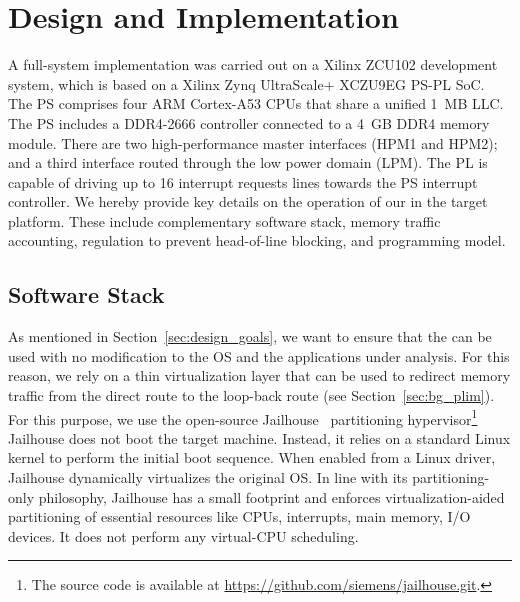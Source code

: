 \section{\schim Design and Implementation}
\label{sec:schim_implmentation}

A full-system implementation was carried out on a Xilinx ZCU102
development system, which is based on a Xilinx Zynq UltraScale+
XCZU9EG PS-PL SoC. The PS comprises four ARM Cortex-A53 CPUs
that share a unified 1~MB LLC. The PS includes a DDR4-2666 controller
connected to a 4~GB DDR4 memory module. There are two high-performance
master interfaces (HPM1 and HPM2); and a third interface routed
through the low power domain (LPM). The PL is capable of driving up to
16 interrupt requests lines towards the PS interrupt controller. We
hereby provide key details on the operation of our \schim in the
target platform. These include complementary software stack, memory
traffic accounting, regulation to prevent head-of-line blocking, and
programming model.


\subsection{Software Stack}
As mentioned in Section~\ref{sec:design_goals}, we want to ensure that
the \schim can be used with no modification to the OS and the
applications under analysis. For this reason, we rely on a thin
virtualization layer that can be used to redirect memory traffic from
the direct route to the loop-back route (see
Section~\ref{sec:bg_plim}). For this purpose, we use the open-source
Jailhouse~\cite{jailhouse} partitioning hypervisor\footnote{The source
  code is available at
  \url{https://github.com/siemens/jailhouse.git}.}  Jailhouse does not
boot the target machine. Instead, it relies on a standard Linux kernel
to perform the initial boot sequence. When enabled from a Linux
driver, Jailhouse dynamically virtualizes the original OS. In line
with its partitioning-only philosophy, Jailhouse has a small footprint
and enforces virtualization-aided partitioning of essential resources
like CPUs, interrupts, main memory, I/O devices. It does not perform
any virtual-CPU scheduling.

